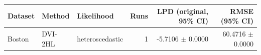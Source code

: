 \begin{tabular}{lllrrr}
\toprule
Dataset & Method & Likelihood & Runs & LPD (original, 95\% CI) & RMSE (95\% CI) \\
\midrule
Boston & DVI-2HL & heteroscedastic & 1 & -5.7106 $\pm$ 0.0000 & 60.4716 $\pm$ 0.0000 \\
\bottomrule
\end{tabular}
